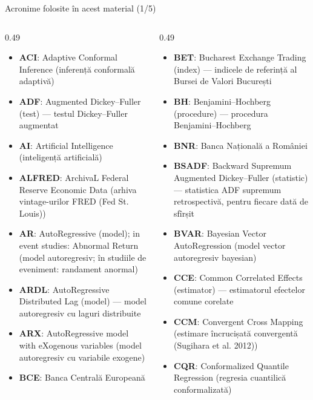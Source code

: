 {
\begin{frame}[noframenumbering]
    \titlepage
\end{frame}
}
\begin{frame}{Acronime folosite în acest material (1/5)}
\begin{columns}[T]
\begin{column}{0.49\textwidth}
\begin{itemize}\setlength{\itemsep}{0pt}
    \item \textbf{ACI}: Adaptive Conformal Inference (inferență conformală adaptivă)
    \item \textbf{ADF}: Augmented Dickey–Fuller (test) — testul Dickey–Fuller augmentat
    \item \textbf{AI}: Artificial Intelligence (inteligență artificială)
    \item \textbf{ALFRED}: ArchivaL Federal Reserve Economic Data (arhiva vintage-urilor FRED (Fed St. Louis))
    \item \textbf{AR}: AutoRegressive (model); in event studies: Abnormal Return (model autoregresiv; în studiile de eveniment: randament anormal)
    \item \textbf{ARDL}: AutoRegressive Distributed Lag (model) — model autoregresiv cu laguri distribuite
    \item \textbf{ARX}: AutoRegressive model with eXogenous variables (model autoregresiv cu variabile exogene)
    \item \textbf{BCE}: Banca Centrală Europeană
\end{itemize}
\end{column}
\begin{column}{0.49\textwidth}
\begin{itemize}\setlength{\itemsep}{0pt}
    \item \textbf{BET}: Bucharest Exchange Trading (index) — indicele de referință al Bursei de Valori București
    \item \textbf{BH}: Benjamini–Hochberg (procedure) — procedura Benjamini–Hochberg
    \item \textbf{BNR}: Banca Națională a României
    \item \textbf{BSADF}: Backward Supremum Augmented Dickey–Fuller (statistic) — statistica ADF supremum retrospectivă, pentru fiecare dată de sfîrșit
    \item \textbf{BVAR}: Bayesian Vector AutoRegression (model vector autoregresiv bayesian)
    \item \textbf{CCE}: Common Correlated Effects (estimator) — estimatorul efectelor comune corelate
    \item \textbf{CCM}: Convergent Cross Mapping (estimare încrucișată convergentă (Sugihara et al. 2012))
    \item \textbf{CQR}: Conformalized Quantile Regression (regresia cuantilică conformalizată)
\end{itemize}
\end{column}
\end{columns}
\end{frame}
